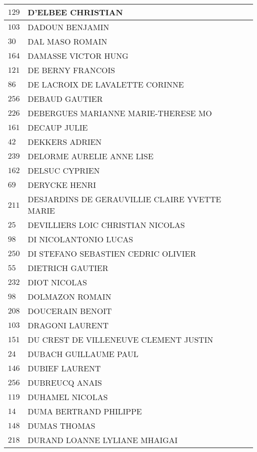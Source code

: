\begin{xltabular}{\linewidth}{|l|X|}
    \hline
    $129$ & D'ELBEE CHRISTIAN \\
    \hline
    $103$ & DADOUN BENJAMIN \\
    \hline
    $30$ & DAL MASO ROMAIN \\
    \hline
    $164$ & DAMASSE VICTOR HUNG \\
    \hline
    $121$ & DE BERNY FRANCOIS \\
    \hline
    $86$ & DE LACROIX DE LAVALETTE CORINNE \\
    \hline
    $256$ & DEBAUD GAUTIER \\
    \hline
    $226$ & DEBERGUES MARIANNE MARIE-THERESE MO \\
    \hline
    $161$ & DECAUP JULIE \\
    \hline
    $42$ & DEKKERS ADRIEN \\
    \hline
    $239$ & DELORME AURELIE ANNE LISE \\
    \hline
    $162$ & DELSUC CYPRIEN \\
    \hline
    $69$ & DERYCKE HENRI \\
    \hline
    $211$ & DESJARDINS DE GERAUVILLIE CLAIRE YVETTE MARIE \\
    \hline
    $25$ & DEVILLIERS LOIC CHRISTIAN NICOLAS \\
    \hline
    $98$ & DI NICOLANTONIO LUCAS \\
    \hline
    $250$ & DI STEFANO SEBASTIEN CEDRIC OLIVIER \\
    \hline
    $55$ & DIETRICH GAUTIER \\
    \hline
    $232$ & DIOT NICOLAS \\
    \hline
    $98$ & DOLMAZON ROMAIN \\
    \hline
    $208$ & DOUCERAIN BENOIT \\
    \hline
    $103$ & DRAGONI LAURENT \\
    \hline
    $151$ & DU CREST DE VILLENEUVE CLEMENT JUSTIN \\
    \hline
    $24$ & DUBACH GUILLAUME PAUL \\
    \hline
    $146$ & DUBIEF LAURENT \\
    \hline
    $256$ & DUBREUCQ ANAIS \\
    \hline
    $119$ & DUHAMEL NICOLAS \\
    \hline
    $14$ & DUMA BERTRAND PHILIPPE \\
    \hline
    $148$ & DUMAS THOMAS \\
    \hline
    $218$ & DURAND LOANNE LYLIANE MHAIGAI \\

\end{xltabular}
